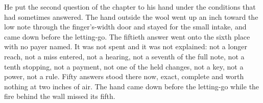 He put the second question of the chapter to his hand under the conditions that had sometimes answered. The hand outside the wool went up an inch toward the low note through the finger's-width door and stayed for the small intake, and came down before the letting-go. The fiftieth answer went onto the sixth place with no payer named. It was not spent and it was not explained: not a longer reach, not a miss entered, not a hearing, not a seventh of the full note, not a tenth stopping, not a payment, not one of the held changes, not a key, not a power, not a rule. Fifty answers stood there now, exact, complete and worth nothing at two inches of air. The hand came down before the letting-go while the fire behind the wall missed its fifth.
